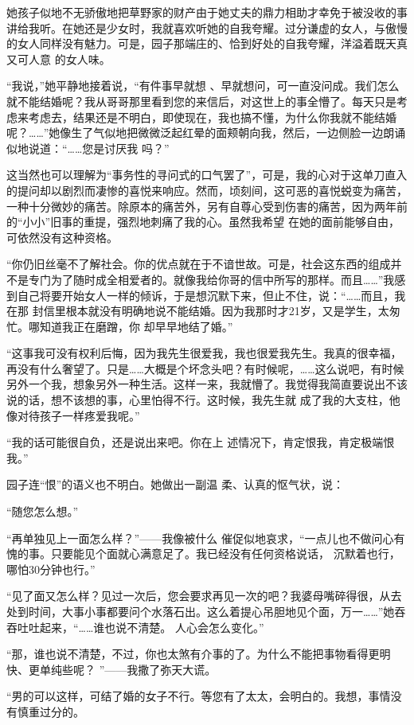 \documentclass{article}
\begin{document}
她孩子似地不无骄傲地把草野家的财产由于她丈夫的鼎力相助才幸免于被没收的事讲给我听。在她还是少女时，我就喜欢听她的自我夸耀。过分谦虚的女人，与傲慢的女人同样没有魅力。可是，园子那端庄的、恰到好处的自我夸耀，洋溢着既天真又可人意
的女人味。 

“我说，”她平静地接着说，“有件事早就想
\newpage
、早就想问，可一直没问成。我们怎么就不能结婚呢？我从哥哥那里看到您的来信后，对这世上的事全懵了。每天只是考虑来考虑去，结果还是不明白，即使现在，我也搞不懂，为什么你我就不能结婚呢？……”她像生了气似地把微微泛起红晕的面颊朝向我，然后，一边侧脸一边朗诵似地说道：“……您是讨厌我
吗？” 

这当然也可以理解为“事务性的寻问式的口气罢了”，可是，我的心对于这单刀直入的提问却以剧烈而凄惨的喜悦来响应。然而，顷刻间，这可恶的喜悦蜕变为痛苦，一种十分微妙的痛苦。除原本的痛苦外，另有自尊心受到伤害的痛苦，因为两年前的“小小”旧事的重提，强烈地刺痛了我的心。虽然我希望
在她的面前能够自由，可依然没有这种资格。 

“你仍旧丝毫不了解社会。你的优点就在于不谙世故。可是，社会这东西的组成并不是专门为了随时成全相爱者的。就像我给你哥的信中所写的那样。而且……”我感到自己将要开始女人一样的倾诉，于是想沉默下来，但止不住，说：“……而且，我在那
\newpage
封信里根本就没有明确地说不能结婚。因为我那时才21岁，又是学生，太匆忙。哪知道我正在磨蹭，你
却早早地结了婚。” 

“这事我可没有权利后悔，因为我先生很爱我，我也很爱我先生。我真的很幸福，再没有什么奢望了。只是……大概是个坏念头吧？有时候呢，……这么说吧，有时候另外一个我，想象另外一种生活。这样一来，我就懵了。我觉得我简直要说出不该说的话，想不该想的事，心里怕得不行。这时候，我先生就
成了我的大支柱，他像对待孩子一样疼爱我呢。” 

“我的话可能很自负，还是说出来吧。你在上
述情况下，肯定恨我，肯定极端恨我。” 

园子连“恨”的语义也不明白。她做出一副温
柔、认真的怄气状，说： 


“随您怎么想。” 

“再单独见上一面怎么样？”——我像被什么
\newpage
催促似地哀求，“一点儿也不做问心有愧的事。只要能见个面就心满意足了。我已经没有任何资格说话，
沉默着也行，哪怕30分钟也行。” 

“见了面又怎么样？见过一次后，您会要求再见一次的吧？我婆母嘴碎得很，从去处到时间，大事小事都要问个水落石出。这么着提心吊胆地见个面，万一……”她吞吞吐吐起来，“……谁也说不清楚。
人心会怎么变化。” 

“那，谁也说不清楚，不过，你也太煞有介事的了。为什么不能把事物看得更明快、更单纯些呢？
”——我撒了弥天大谎。 

“男的可以这样，可结了婚的女子不行。等您有了太太，会明白的。我想，事情没有慎重过分的。
\end{document}
